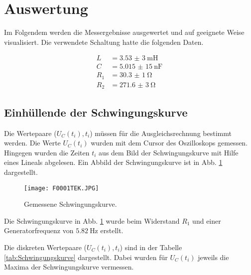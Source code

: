 
\section{Auswertung}

Im Folgendem werden die Messergebnisse ausgewertet und auf geeignete Weise
visualisiert.
Die verwendete Schaltung hatte die folgenden Daten.

\begin{align*}
  L &= \SI{3,53(3)}{\milli\henry} \\
  C &= \SI{5,015(15)}{\nano\farad} \\
  R_1 &= \SI{30,3(1)}{\ohm} \\
  R_2 &= \SI{271,6(3)}{\ohm}
\end{align*}

\subsection{Einhüllende der Schwingungskurve}

Die Wertepaare ($U_C(t_i), t_i$) müssen für die Ausgleichsrechnung bestimmt werden.
Die Werte $U_C(t_i)$ wurden mit dem Cursor des Oszilloskops gemessen.
Hingegen wurden die Zeiten $t_i$ aus dem Bild der Schwingungskurve mit
Hilfe eines Lineals abgelesen. Ein Abbild der Schwingungskurve ist in Abb.
\ref{fig:Schwingungskurve} dargestellt.

\begin{figure}
  \centering
  \texttt{[image: F0001TEK.JPG]}
  \caption{Gemessene Schwingungskurve.}
  \label{fig:Schwingungskurve}
\end{figure}

Die Schwingungskurve in Abb. \ref{fig:Schwingungskurve} wurde beim
Widerstand $R_1$ und einer Generatorfrequenz von $\SI{5,82}{\hertz}$ erstellt.

Die diskreten Wertepaare ($U_C(t_i), t_i$) sind in der Tabelle \ref{tab:Schwingungskurve}
dargestellt. Dabei wurden für $U_C(t_i)$ jeweils die Maxima der Schwingungskurve
vermessen.

